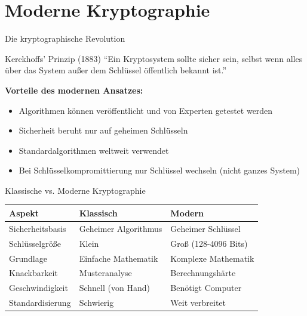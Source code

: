 \documentclass[handout]{beamer}
\begin{document}
\section{Moderne Kryptographie}

\begin{frame}{Die kryptographische Revolution}
\begin{block}{Kerckhoffs' Prinzip (1883)}
``Ein Kryptosystem sollte sicher sein, selbst wenn alles über das System außer dem Schlüssel öffentlich bekannt ist.''
\end{block}

\vspace{0.3cm}
\textbf{Vorteile des modernen Ansatzes:}
\begin{itemize}
    \item Algorithmen können veröffentlicht und von Experten getestet werden
    \item Sicherheit beruht nur auf geheimen Schlüsseln
    \item Standardalgorithmen weltweit verwendet
    \item Bei Schlüsselkompromittierung nur Schlüssel wechseln (nicht ganzes System)
\end{itemize}
\end{frame}

\begin{frame}{Klassische vs. Moderne Kryptographie}
\begin{center}
\begin{tabular}{|l|l|l|}
\hline
\textbf{Aspekt} & \textbf{Klassisch} & \textbf{Modern} \\
\hline
Sicherheitsbasis & Geheimer Algorithmus & Geheimer Schlüssel \\
Schlüsselgröße & Klein & Groß (128-4096 Bits) \\
Grundlage & Einfache Mathematik & Komplexe Mathematik \\
Knackbarkeit & Musteranalyse & Berechnungshärte \\
Geschwindigkeit & Schnell (von Hand) & Benötigt Computer \\
Standardisierung & Schwierig & Weit verbreitet \\
\hline
\end{tabular}
\end{center}

\end{frame}
\end{document}
